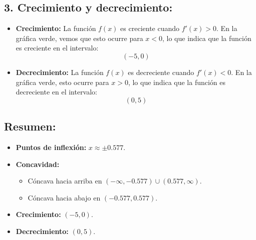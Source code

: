 \documentclass[11pt,letterpaper]{article}
\begin{document}
\subsection*{3. Crecimiento y decrecimiento:}

\begin{itemize}
    \item \textbf{Crecimiento:} La función \( f(x) \) es creciente cuando \( f'(x) > 0 \). En la gráfica verde, vemos que esto ocurre para \( x < 0 \), lo que indica que la función es creciente en el intervalo:
    \[
    (-5, 0)
    \]
    
    \item \textbf{Decrecimiento:} La función \( f(x) \) es decreciente cuando \( f'(x) < 0 \). En la gráfica verde, esto ocurre para \( x > 0 \), lo que indica que la función es decreciente en el intervalo:
    \[
    (0, 5)
    \]
\end{itemize}

\subsection*{Resumen:}

\begin{itemize}
    \item \textbf{Puntos de inflexión:} \( x \approx \pm 0.577 \).
    \item \textbf{Concavidad:}
    \begin{itemize}
        \item Cóncava hacia arriba en \( (-\infty, -0.577) \cup (0.577, \infty) \).
        \item Cóncava hacia abajo en \( (-0.577, 0.577) \).
    \end{itemize}
    \item \textbf{Crecimiento:} \( (-5, 0) \).
    \item \textbf{Decrecimiento:} \( (0, 5) \).
\end{itemize}
\end{document}
